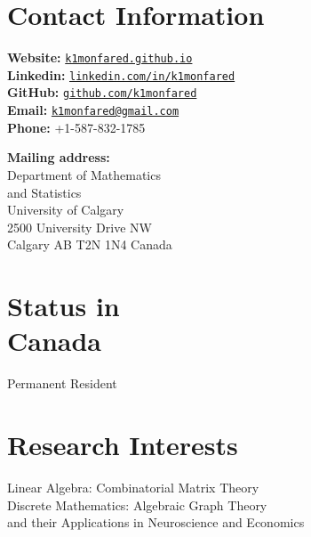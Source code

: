 \documentclass[margin,line,pifont,palatino,courier]{res}
\begin{document}

\begin{resume}

\section{\sc Contact Information}

\vspace{.05in}
\begin{minipage}[t]{.6\textwidth}
\noindent \textbf{Website:} \href{http://k1monfared.github.io}{\texttt{k1monfared.github.io}}\\ 
\textbf{Linkedin:} \href{http://www.linkedin.com/in/k1monfared}{\texttt{linkedin.com/in/k1monfared}}\\
\textbf{GitHub:} \href{http://github.com/k1monfared}{\texttt{github.com/k1monfared}}\\
\textbf{Email:} \href{mailto:k1monfared@gmail.com}{\texttt{k1monfared@gmail.com}}\\
\textbf{Phone:} +1-587-832-1785
\end{minipage} \begin{minipage}[t]{.55\textwidth}
\textbf{Mailing address:}\\ 
Department of Mathematics \\and Statistics\\
University of Calgary\\
2500 University Drive NW\\
Calgary AB T2N 1N4 Canada 
\end{minipage}

\vspace*{-5pt}
\section{\sc Status in\\ Canada} Permanent Resident


\section{\sc Research Interests}
Linear Algebra: Combinatorial Matrix Theory\\
Discrete Mathematics: Algebraic Graph Theory\\
and their Applications in Neuroscience and Economics

\vspace*{-5pt}


\end{resume}
\end{document}
